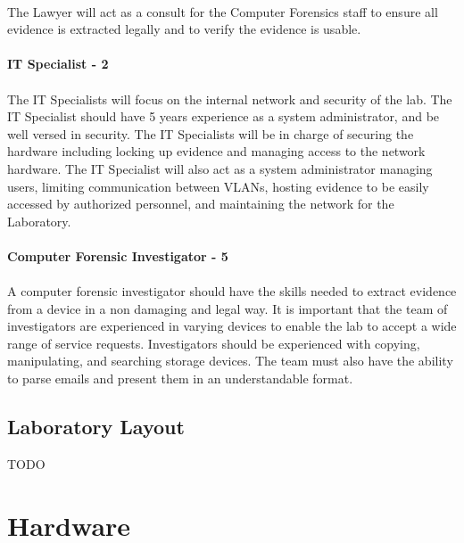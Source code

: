 \documentclass{article}
\begin{document}
\paragraph{} The Lawyer will act as a consult for the Computer Forensics staff to ensure all evidence is extracted legally and to verify the evidence is usable.

\paragraph{IT Specialist - 2}
\paragraph{}
The IT Specialists will focus on the internal network and security of the lab.
The IT Specialist should have 5 years experience as a system administrator, and be well versed in security.
The IT Specialists will be in charge of securing the hardware including locking up evidence and managing access to the network hardware.
The IT Specialist will also act as a system administrator managing users, limiting communication between VLANs, hosting evidence to be easily accessed by authorized personnel, and maintaining the network for the Laboratory.

\paragraph{Computer Forensic Investigator - 5}
\paragraph{}
A computer forensic investigator should have the skills needed to extract evidence from a device in a non damaging and legal way.
It is important that the team of investigators are experienced in varying devices to enable the lab to accept a wide range of service requests.
Investigators should be experienced with copying, manipulating, and searching storage devices.
The team must also have the ability to parse emails and present them in an understandable format.

\subsection{Laboratory Layout}
TODO


\section{Hardware}
\end{document}
